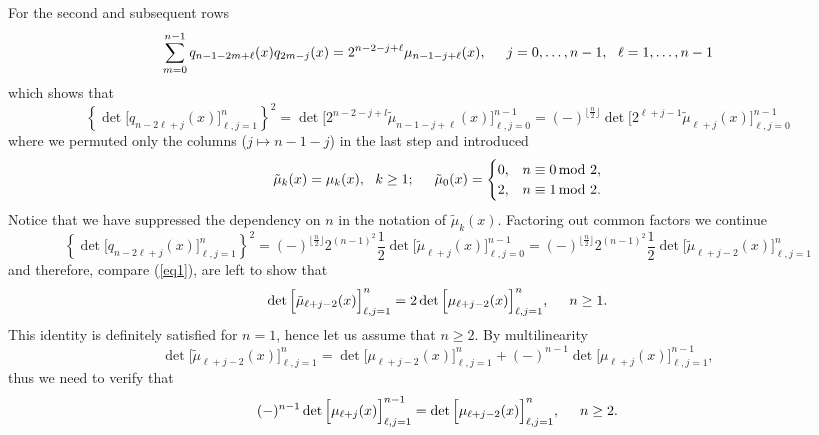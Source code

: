 \documentclass[10pt,oneside,reqno]{amsart}
\numberwithin{equation}{section}
\def\be{\begin{equation}}
\def\ee{\end{equation}}
\def\mod{\, \mathrm{mod}\,\,}
\def\eqref#1{(\ref{#1})}
\begin{document}
For the second and subsequent rows
\begin{equation*}
  \sum_{m=0}^{n-1}q_{n-1-2m+\ell}(x)q_{2m-j}(x) = 2^{n-2-j+\ell}\mu_{n-1-j+\ell}(x),\hspace{0.5cm}j=0,\ldots,n-1,\ \ \ell=1,\ldots,n-1
\end{equation*}
which shows that
\begin{equation*}
  \left\{\det\Big[q_{n-2\ell+j}(x)\Big]_{\ell,j=1}^n\right\}^2 =\det\Big[2^{n-2-j+l}\tilde{\mu}_{n-1-j+\ell}(x)\Big]_{\ell,j=0}^{n-1} =
  (-)^{\lfloor\frac{n}{2}\rfloor}\det\Big[2^{\ell+j-1}\tilde{\mu}_{\ell+j}(x)\Big]_{\ell,j=0}^{n-1}
\end{equation*}
where we permuted only the columns ($j\mapsto n-1-j$) in the last step and introduced
\begin{equation*}
  \tilde{\mu}_k(x) = \mu_k(x),\ \ k\geq 1;\hspace{0.5cm} \tilde{\mu}_0(x) = \begin{cases}
                                                                             0, & n\equiv 0\mod 2,\\
2, & n\equiv 1\mod 2.
                                                                            \end{cases}
\end{equation*}
Notice that we have suppressed the dependency on $n$ in the notation of $\tilde{\mu}_k(x)$. Factoring out common factors we continue
\begin{equation*}
  \left\{\det\Big[q_{n-2\ell+j}(x)\Big]_{\ell,j=1}^n\right\}^2=(-)^{\lfloor\frac{n}{2}\rfloor}2^{(n-1)^2}\frac{1}{2}
  \det\Big[\tilde{\mu}_{\ell+j}(x)\Big]_{\ell,j=0}^{n-1} = (-)^{\lfloor\frac{n}{2}\rfloor}2^{(n-1)^2}\frac{1}{2}\det\Big[\tilde{\mu}_{\ell+j-2}(x)\Big]_{\ell,j=1}^n
\end{equation*}
and therefore, compare \eqref{eq1}, are left to show that
\begin{equation}\label{eq2}
  \det\Big[\tilde{\mu}_{\ell+j-2}(x)\Big]_{\ell,j=1}^{n} = 2\det\Big[\mu_{\ell+j-2}(x)\Big]_{\ell,j=1}^{n},\hspace{0.5cm}n\geq 1.
\end{equation}
This identity is definitely satisfied for $n=1$, hence let us assume that $n\geq 2$. By multilinearity 
\be\nonumber
\det\Big[\tilde{\mu}_{\ell+j-2}(x)\Big]_{\ell,j=1}^n=\det\Big[\mu_{\ell+j-2}(x)\Big]_{\ell,j=1}^n+(-)^{n-1}\det\Big[\mu_{\ell+j}(x)\Big]_{\ell,j=1}^{n-1},
\ee
thus we need to verify that
\begin{equation}\label{eq3}
  (-)^{n-1}\det\Big[\mu_{\ell+j}(x)\Big]_{\ell,j=1}^{n-1} = \det\Big[\mu_{\ell+j-2}(x)\Big]_{\ell,j=1}^{n},\hspace{0.5cm}n\geq 2.
\end{equation}
\end{document}
